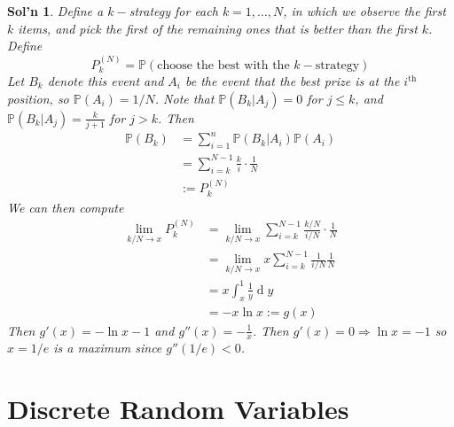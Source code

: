 \documentclass[12pt, a4paper]{book}
\renewcommand{\Pr}{\mathbb{P}}
\renewcommand{\d}[1]{\ensuremath{\operatorname{d}\!{#1}}} %
\theoremstyle{nonumberplain}
\newtheorem{solution}{Sol'n}
\begin{document}
\begin{solution}
    Define a $k-$strategy for each $k=1,\ldots,N$, in which we observe the first $k$ items, and pick the first of the remaining ones that is better than the first $k$.
    Define
    \[P_k^{(N)}=\Pr(\text{choose the best with the $k-$strategy})\]
    Let $B_k$ denote this event and $A_i$ be the event that the best prize is at the $i^\text{th}$ position, so $\Pr(A_i)=1/N$.
    Note that $\Pr(B_k|A_j)=0$ for $j\leq k$, and $\Pr(B_k|A_j)=\frac{k}{j+1}$ for $j>k$.
    Then
    \begin{align*}
        \Pr(B_k) &= \sum\limits_{i=1}^n\Pr(B_k|A_i)\Pr(A_i)\\
                 &= \sum\limits_{i=k}^{N-1}\frac{k}{i}\cdot\frac{1}{N}\\
                 &:= P_k^{(N)}
    \end{align*}
    We can then compute
    \begin{align*}
        \lim_{k/N\to x}P_k^{(N)} &= \lim_{k/N\to x}\sum\limits_{i=k}^{N-1}\frac{k/N}{i/N}\cdot\frac{1}{N}\\
            &= \lim_{k/N\to x}x\sum\limits_{i=k}^{N-1}\frac{1}{i/N}\frac{1}{N}\\
            &= x\int_x^1\frac{1}{y}\d{y}\\
            &= -x\ln x := g(x)
    \end{align*}
    Then $g'(x)=-\ln x-1$ and $g''(x)=-\frac{1}{x}$.
    Then $g'(x)=0\Rightarrow \ln x=-1$ so $x=1/e$ is a maximum since $g''(1/e)<0$.
    \begin{center}
    \end{center}
\end{solution}
\chapter{Discrete Random Variables}
\end{document}
